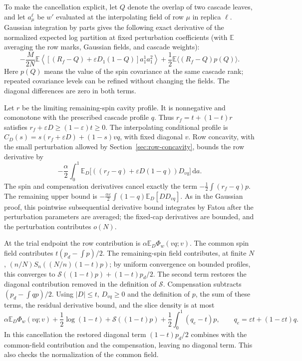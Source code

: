 \documentclass[11pt,a4paper]{article}
\numberwithin{equation}{section}
\theoremstyle{definition}
\theoremstyle{remark}
\newcommand{\E}{\mathbb E}
\newcommand{\dd}{\mathrm d}
\newcommand{\eps}{\varepsilon}
\begin{document}
To make the cancellation explicit, let $Q$ denote the overlap of two
cascade leaves, and let $a_\mu^\ell$ be $w'$ evaluated at the interpolating
field of row $\mu$ in replica $\ell$.  Gaussian integration by parts gives
the following exact derivative of the normalized expected log partition
at fixed perturbation coefficients (with $\E$ averaging the row marks,
Gaussian fields, and cascade weights):
\[
 -\frac{M}{2N}\E\left\langle
  [(R_f-Q)+\eps D_1(1-Q)]a_1^1a_1^2\right\rangle
 +\frac12\E\langle(R_f-Q)p(Q)\rangle.
\]
Here $p(Q)$ means the value of the spin covariance at the same cascade
rank; repeated covariance levels can be refined without changing the
fields.  The diagonal differences are zero in both terms.

Let $r$ be the limiting remaining-spin cavity profile.  It is
nonnegative and comonotone with the prescribed cascade profile $q$.
Thus $r_f=t+(1-t)r$ satisfies $r_f+\eps D\ge(1-\eps)t\ge0$.
The interpolating conditional profile is
$C_D(s)=s(r_f+\eps D)+(1-s)vq$, with fixed diagonal $v$.
Row concavity, with the small perturbation allowed by
Section~\ref{sec:row-concavity}, bounds the row derivative by
\[
 -\frac\alpha2\int_0^1
    \E_D\big[((r_f-q)+\eps D(1-q))D_{vq}\big]\,\dd a.
\]
The spin and compensation derivatives cancel exactly the term
$-\frac12\int(r_f-q)p$.  The remaining upper bound is
$-\frac{\alpha\eps}{2}\int(1-q)\E_D[DD_{vq}]$.
As in the Gaussian proof, this pointwise subsequential derivative bound
integrates by Fatou after the perturbation parameters are averaged;
the fixed-cap derivatives are bounded, and the perturbation contributes
$o(N)$.

At the trial endpoint the row contribution is
$\alpha\E_D\Phi_w(vq;v)$.  The common spin field contributes
$t(p_d-\int p)/2$.  The remaining-spin field contributes, at finite $N$,
$(n/N)S_n((N/n)(1-t)p)$; by uniform convergence on bounded profiles,
this converges to $\mathcal S((1-t)p)+(1-t)p_d/2$.  The second term
restores the diagonal contribution removed in the definition of
$\mathcal S$.
Compensation subtracts
$(p_d-\int qp)/2$.  Using $|D|\le t$, $D_{vq}\ge0$ and the definition
of $p$, the sum of these terms, the residual derivative bound, and the
slice density is at most
\begin{equation}\label{eq:univ-slice-bound}
 \alpha\E_D\Phi_w(vq;v)+\frac12\log(1-t)
 +\mathcal S((1-t)p)+\frac12\int_0^1(q_e-t)p,\qquad
 q_e=\eps t+(1-\eps t)q.
\end{equation}
In this cancellation the restored diagonal term $(1-t)p_d/2$ combines
with the common-field contribution and the compensation, leaving no
diagonal term.  This also checks the normalization of the common field.
\end{document}
